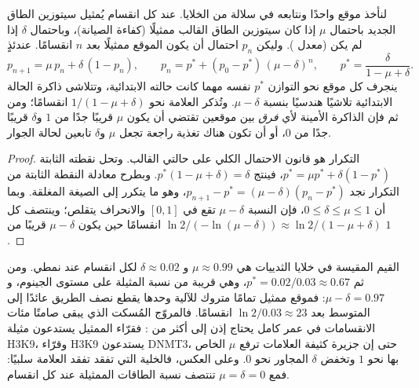 \begin{theorem}\label{thm:b3:chromatin-epigenetics:maintenance}
لنأخذ موقع  واحدًا ونتابعه في سلالة من الخلايا. عند كل انقسام
يُمثيل سيتوزين الطاق الجديد باحتمال $\mu$ إذا كان سيتوزين الطاق
القالب ممثيلًا (كفاءة الصيانة)، وباحتمال $\delta$ إذا لم يكن (معدل
). وليكن $p_{n}$ احتمال أن يكون الموقع ممثيلًا بعد
$n$ انقسامًا. عندئذٍ
\[
p_{n+1} = \mu\, p_{n} + \delta\,(1 - p_{n}),
\qquad
p_{n} = p^{*} + (p_{0} - p^{*})\,(\mu - \delta)^{n},
\qquad
p^{*} = \frac{\delta}{1 - \mu + \delta}.
\]
ينجرف كل موقع نحو التوازن $p^{*}$ نفسه مهما كانت حالته الابتدائية،
وتتلاشى ذاكرة الحالة الابتدائية تلاشيًا هندسيًا بنسبة $\mu - \delta$.
وتُذكر العلامة نحو $1/(1 - \mu + \delta)$ انقسامًا؛ ومن ثم فإن
الذاكرة الأمينة لأي \emph{فرق} بين موقعين تقتضي أن يكون $\mu$ قريبًا
جدًا من $1$ و$\delta$ قريبًا جدًا من $0$، أو أن تكون هناك تغذية راجعة
تجعل $\mu$ و$\delta$ تابعين لحالة الجوار.
\end{theorem}
\begin{proof}
التكرار هو قانون الاحتمال الكلي على حالتي القالب. وتحل نقطته الثابتة
$p^{*} = \mu p^{*} + \delta(1 -
p^{*})$، فينتج $p^{*}(1 - \mu + \delta) = \delta$. وبطرح معادلة النقطة الثابتة من
التكرار نجد $p_{n+1} - p^{*} = (\mu -
\delta)(p_{n} - p^{*})$، وهو ما يتكرر إلى الصيغة المغلقة. وبما أن
$0 \le \delta \le \mu \le 1$، فإن النسبة $\mu - \delta$ تقع في $[0,1]$
والانحراف يتقلص؛ وينتصف كل $\ln 2 / (-\ln(\mu -
\delta)) \approx \ln 2/(1 - \mu + \delta)$ انقسامًا حين يكون $\mu -
\delta$ قريبًا من $1$.
\end{proof}

\begin{example}[أرقام]\label{ex:b3:chromatin-epigenetics:maintenance-numbers}
القيم المقيسة في خلايا الثدييات هي $\mu \approx 0.99$ و
$\delta \approx 0.02$ لكل انقسام عند  نمطي. ومن ثم $p^{*} =
0.02/0.03 \approx 0.67$، وهي قريبة من نسبة المثيلة على مستوى الجينوم،
و$\mu - \delta = 0.97$: فموقع ممثيل تمامًا متروك للآلية وحدها يقطع
نصف الطريق عائدًا إلى المتوسط بعد $\ln 2 /
0.03 \approx 23$ انقسامًا. فالمروّج المُسكت الذي يبقى صامتًا مئات
الانقسامات في عمر كامل يحتاج إذن إلى أكثر من : فقرّاء 
الممثيل يستدعون مثيلة H3K9، وقرّاء H3K9 يستدعون DNMT3، حتى إن جزيرة
كثيفة العلامات ترفع $\mu$ الخاص بها نحو $1$ وتخفض $\delta$ المجاور
نحو $0$. وعلى العكس، فالخلية التي تفقد  تفقد العلامة سلبيًا:
فمع $\mu = \delta = 0$ تنتصف نسبة الطاقات الممثيلة عند كل انقسام.
\end{example}

